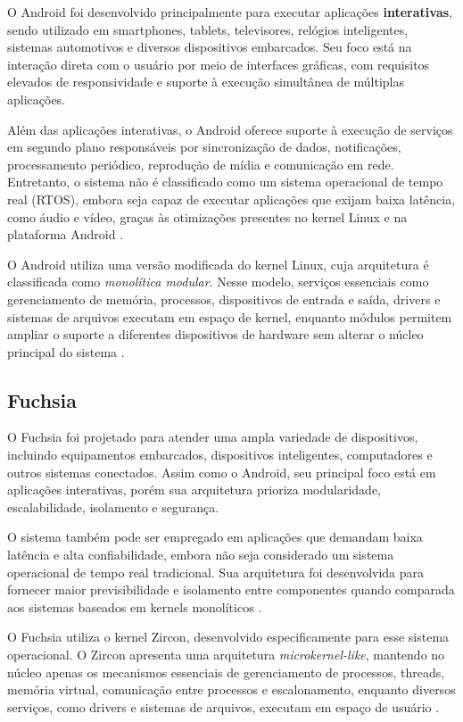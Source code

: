 \documentclass[12pt,a4paper]{article}
\begin{document}
O Android foi desenvolvido principalmente para executar aplicações
\textbf{interativas}, sendo utilizado em smartphones, tablets, televisores,
relógios inteligentes, sistemas automotivos e diversos dispositivos embarcados.
Seu foco está na interação direta com o usuário por meio de interfaces gráficas,
com requisitos elevados de responsividade e suporte à execução simultânea de
múltiplas aplicações.

Além das aplicações interativas, o Android oferece suporte à execução de
serviços em segundo plano responsáveis por sincronização de dados, notificações,
processamento periódico, reprodução de mídia e comunicação em rede. Entretanto,
o sistema não é classificado como um sistema operacional de tempo real (RTOS),
embora seja capaz de executar aplicações que exijam baixa latência, como áudio
e vídeo, graças às otimizações presentes no kernel Linux e na plataforma
Android \cite{aosp,aospkernel}.

O Android utiliza uma versão modificada do kernel Linux, cuja arquitetura é
classificada como \emph{monolítica modular}. Nesse modelo, serviços essenciais
como gerenciamento de memória, processos, dispositivos de entrada e saída,
drivers e sistemas de arquivos executam em espaço de kernel, enquanto módulos
permitem ampliar o suporte a diferentes dispositivos de hardware sem alterar o
núcleo principal do sistema \cite{aospkernel}.

\subsection{Fuchsia}

O Fuchsia foi projetado para atender uma ampla variedade de dispositivos,
incluindo equipamentos embarcados, dispositivos inteligentes, computadores e
outros sistemas conectados. Assim como o Android, seu principal foco está em
aplicações interativas, porém sua arquitetura prioriza modularidade,
escalabilidade, isolamento e segurança.

O sistema também pode ser empregado em aplicações que demandam baixa latência e
alta confiabilidade, embora não seja considerado um sistema operacional de
tempo real tradicional. Sua arquitetura foi desenvolvida para fornecer maior
previsibilidade e isolamento entre componentes quando comparada aos sistemas
baseados em kernels monolíticos \cite{fuchsiadev}.

O Fuchsia utiliza o kernel Zircon, desenvolvido especificamente para esse
sistema operacional. O Zircon apresenta uma arquitetura
\emph{microkernel-like}, mantendo no núcleo apenas os mecanismos essenciais de
gerenciamento de processos, threads, memória virtual, comunicação entre
processos e escalonamento, enquanto diversos serviços, como drivers e sistemas
de arquivos, executam em espaço de usuário \cite{zircon}.
\end{document}
